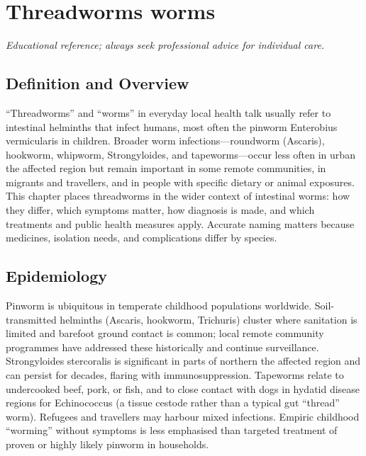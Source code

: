 \chapter{Threadworms worms}

\medskip
\noindent\textit{Educational reference; always seek professional advice for individual care.}

\section*{Definition and Overview}
``Threadworms'' and ``worms'' in everyday local health talk usually refer to intestinal helminths that infect humans, most often the pinworm Enterobius vermicularis in children. Broader worm infections---roundworm (Ascaris), hookworm, whipworm, Strongyloides, and tapeworms---occur less often in urban the affected region but remain important in some remote communities, in migrants and travellers, and in people with specific dietary or animal exposures. This chapter places threadworms in the wider context of intestinal worms: how they differ, which symptoms matter, how diagnosis is made, and which treatments and public health measures apply. Accurate naming matters because medicines, isolation needs, and complications differ by species.

\section*{Epidemiology}
Pinworm is ubiquitous in temperate childhood populations worldwide. Soil-transmitted helminths (Ascaris, hookworm, Trichuris) cluster where sanitation is limited and barefoot ground contact is common; local remote community programmes have addressed these historically and continue surveillance. Strongyloides stercoralis is significant in parts of northern the affected region and can persist for decades, flaring with immunosuppression. Tapeworms relate to undercooked beef, pork, or fish, and to close contact with dogs in hydatid disease regions for Echinococcus (a tissue cestode rather than a typical gut ``thread'' worm). Refugees and travellers may harbour mixed infections. Empiric childhood ``worming'' without symptoms is less emphasised than targeted treatment of proven or highly likely pinworm in households.

